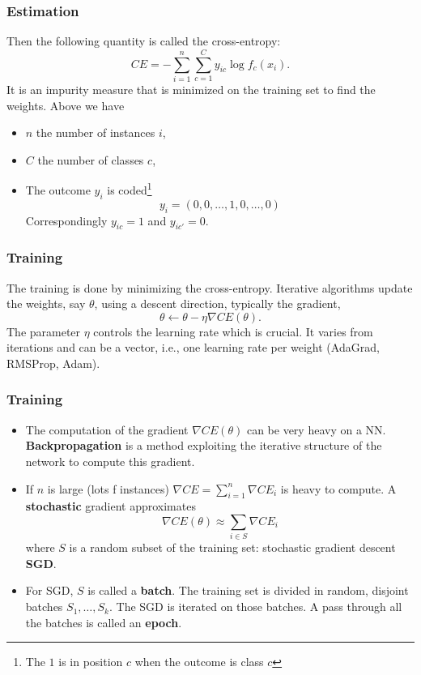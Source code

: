 \begin{frame}
\frametitle{Estimation}
Then the following quantity is called the cross-entropy:
$$
CE = - \sum_{i=1}^n \sum_{c=1}^C y_{ic}\log f_c(x_i).
$$
It is an impurity measure that is minimized on the training set to find the weights.
Above we have
\begin{itemize}
\item $n$ the number of instances $i$,
\item $C$ the number of classes $c$,
\item The outcome $y_i$ is coded\footnote{The $1$ is in position $c$ when the outcome is class $c$}
$$
y_{i}=(0, 0, \ldots, 1, 0, \ldots, 0)
$$
Correspondingly $y_{ic}=1$ and $y_{ic'}=0$.
\end{itemize}

\end{frame}
\begin{frame}
\frametitle{Training}
The training is done by minimizing the cross-entropy. Iterative algorithms update the weights, say $\theta$, using a descent direction, typically the gradient,
$$
\theta \leftarrow \theta - \eta \nabla CE(\theta).
$$
The parameter $\eta$ controls the learning rate which is crucial. It varies from iterations and can be a vector, i.e., one learning rate per weight (AdaGrad, RMSProp, Adam).
\end{frame}
\begin{frame}
\frametitle{Training}
\begin{itemize}
\item The computation of the gradient $\nabla CE(\theta)$ can be very heavy on a NN. {\bf Backpropagation} is a method exploiting the iterative structure of the network to compute this gradient.
\item If $n$ is large (lots f instances) $\nabla CE=\sum_{i=1}^n \nabla CE_i$ is heavy to compute. A {\bf stochastic} gradient approximates
$$
\nabla CE(\theta) \approx \sum_{i \in S} \nabla CE_i
$$
where $S$ is a random subset of the training set: stochastic gradient descent {\bf SGD}.
\item For SGD, $S$ is called a {\bf batch}. The training set is divided in random, disjoint batches $S_1,\ldots,S_k$. The SGD is iterated on those batches. A pass through all the batches is called an {\bf epoch}.
\end{itemize}
\end{frame}
